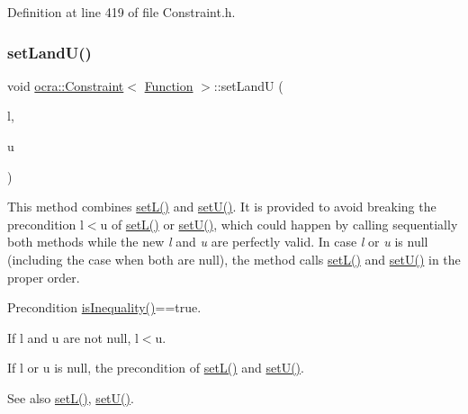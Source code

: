 Definition at line 419 of file Constraint.\+h.

\hypertarget{classocra_1_1Constraint_3_01Function_01_4_adbf50d4faf459c8e6469937b0501b5e2}{}\label{classocra_1_1Constraint_3_01Function_01_4_adbf50d4faf459c8e6469937b0501b5e2} 
\subsubsection{\texorpdfstring{set\+Land\+U()}{setLandU()}}
{\footnotesize\ttfamily void \hyperlink{classocra_1_1Constraint}{ocra\+::\+Constraint}$<$ \hyperlink{classocra_1_1Function}{Function} $>$\+::set\+LandU (\begin{DoxyParamCaption}\item[{const Vector\+Xd \&}]{l,  }\item[{const Vector\+Xd \&}]{u }\end{DoxyParamCaption})\hspace{0.3cm}{\ttfamily [inline]}}

This method combines \hyperlink{classocra_1_1Constraint_3_01Function_01_4_a9bfbc2cff3d9ad7099f8f51228b541c4}{set\+L()} and \hyperlink{classocra_1_1Constraint_3_01Function_01_4_a80c1536eb85f6913a8d80a36456aa90a}{set\+U()}. It is provided to avoid breaking the precondition l$<$u of \hyperlink{classocra_1_1Constraint_3_01Function_01_4_a9bfbc2cff3d9ad7099f8f51228b541c4}{set\+L()} or \hyperlink{classocra_1_1Constraint_3_01Function_01_4_a80c1536eb85f6913a8d80a36456aa90a}{set\+U()}, which could happen by calling sequentially both methods while the new {\itshape l} and {\itshape u} are perfectly valid. In case {\itshape l} or {\itshape u} is null (including the case when both are null), the method calls \hyperlink{classocra_1_1Constraint_3_01Function_01_4_a9bfbc2cff3d9ad7099f8f51228b541c4}{set\+L()} and \hyperlink{classocra_1_1Constraint_3_01Function_01_4_a80c1536eb85f6913a8d80a36456aa90a}{set\+U()} in the proper order.

\begin{DoxyPrecond}{Precondition}
\hyperlink{classocra_1_1Constraint_3_01Function_01_4_ab9083572de0c38297a7c20d88b82e183}{is\+Inequality()}==true. 

If l and u are not null, l$<$u. 

If l or u is null, the precondition of \hyperlink{classocra_1_1Constraint_3_01Function_01_4_a9bfbc2cff3d9ad7099f8f51228b541c4}{set\+L()} and \hyperlink{classocra_1_1Constraint_3_01Function_01_4_a80c1536eb85f6913a8d80a36456aa90a}{set\+U()}.
\end{DoxyPrecond}
\begin{DoxySeeAlso}{See also}
\hyperlink{classocra_1_1Constraint_3_01Function_01_4_a9bfbc2cff3d9ad7099f8f51228b541c4}{set\+L()}, \hyperlink{classocra_1_1Constraint_3_01Function_01_4_a80c1536eb85f6913a8d80a36456aa90a}{set\+U()}. 
\end{DoxySeeAlso}


